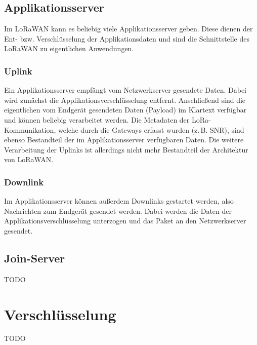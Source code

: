 \subsection{Applikationsserver}
Im LoRaWAN kann es beliebig viele Applikationsserver geben.
Diese dienen der Ent- bzw. Verschlüsselung der Applikationsdaten und sind die Schnittstelle des LoRaWAN zu eigentlichen Anwendungen.

\subsubsection{Uplink}
Ein Applikationsserver empfängt vom Netzwerkserver gesendete Daten.
Dabei wird zunächst die Applikationsverschlüsselung entfernt.
Anschließend sind die eigentlichen vom Endgerät gesendeten Daten (\gls{Payload}) im Klartext verfügbar und können beliebig verarbeitet werden.
Die Metadaten der LoRa-Kommunikation, welche durch die Gateways erfasst wurden (z.\,B. \gls{SNR}), sind ebenso Bestandteil der im Applikationsserver verfügbaren Daten.
Die weitere Verarbeitung der Uplinks ist allerdings nicht mehr Bestandteil der Architektur von LoRaWAN.

\subsubsection{Downlink}
Im Applikationsserver können außerdem Downlinks gestartet werden, also Nachrichten zum Endgerät gesendet werden.
Dabei werden die Daten der Applikationsverschlüsselung unterzogen und das Paket an den Netzwerkserver gesendet.


\subsection{Join-Server}
TODO


\section{Verschlüsselung}
TODO


